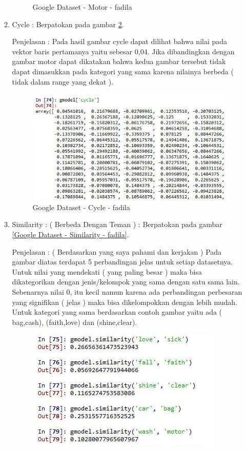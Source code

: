 \begin{enumerate}
\begin{enumerate}
\begin{figure}[!hbtp]
\caption{Google Dataset - Motor - fadila}
\label{Google Dataset - Motor - fadila}
\end{figure}
\par
\item Cycle :  Berpatokan pada gambar \ref{Google Dataset - Cycle - fadila}.
\par Penjelasan : Pada hasil gambar cycle dapat dilihat bahwa nilai pada vektor baris pertamanya yaitu sebesar 0,04. Jika dibandingkan dengan gambar motor dapat dikatakan bahwa kedua gambar tersebut tidak dapat dimasukkan pada kategori yang sama  karena nilainya berbeda ( tidak dalam range yang dekat ).
\par
\begin{figure}[!hbtp]
\centering
\includegraphics[scale=0.3]{figures/1-cycle-fadila.jpg}
\caption{Google Dataset - Cycle - fadila}
\label{Google Dataset - Cycle - fadila}
\end{figure}
\par
\item Similarity : ( Berbeda Dengan Teman ) :  Berpatokan pada gambar \ref{Google Dataset - Similarity - fadila}.
\par Penjelasan : ( Berdasarkan yang saya pahami dan kerjakan ) Pada gambar diatas terdapat 5 perbandingan jelas untuk setiap datasetnya. Untuk nilai yang mendekati ( yang paling besar ) maka bisa dikategorikan dengan jenis/kelompok yang sama dengan satu sama lain. Sebenarnya nilai 0, itu kecil namun karena ada perbandingan perbesaran yang signifikan ( jelas ) maka bisa dikelompokkan dengan lebih mudah. Untuk kategori yang sama berdasarkan contoh gambar yaitu ada ( bag,cash), (faith,love) dan (shine,clear). 
\par
\begin{figure}[!hbtp]
\centering
\includegraphics[scale=0.3]{figures/1-similarity-fadila.jpg}

\end{figure}
\end{enumerate}
\end{enumerate}
